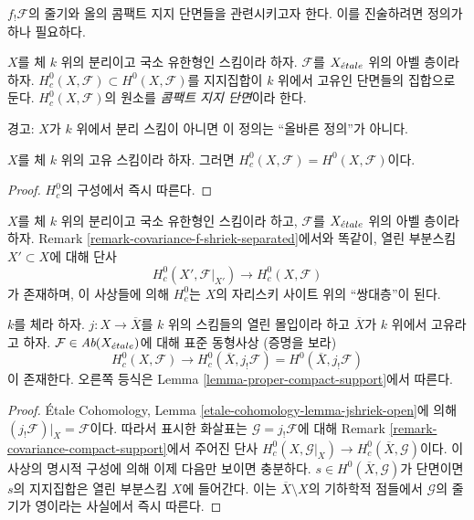 \noindent
$f_!\mathcal{F}$의 줄기와 올의 콤팩트 지지 단면들을 관련시키고자 한다.
이를 진술하려면 정의가 하나 필요하다.

\begin{definition}
\label{definition-compact-support}
$X$를 체 $k$ 위의 분리이고 국소 유한형인 스킴이라 하자.
$\mathcal{F}$를 $X_{\acute{e}tale}$ 위의 아벨 층이라 하자.
$H^0_c(X,\mathcal{F}) \subset H^0(X,\mathcal{F})$를 지지집합이
$k$ 위에서 고유인 단면들의 집합으로 둔다.
$H^0_c(X,\mathcal{F})$의 원소를 {\it 콤팩트 지지 단면}이라 한다.
\end{definition}

\noindent
경고: $X$가 $k$ 위에서 분리 스킴이 아니면 이 정의는 “올바른 정의”가
아니다.

\begin{lemma}
\label{lemma-proper-compact-support}
$X$를 체 $k$ 위의 고유 스킴이라 하자. 그러면
$H^0_c(X, \mathcal{F}) = H^0(X, \mathcal{F})$이다.
\end{lemma}

\begin{proof}
$H^0_c$의 구성에서 즉시 따른다.
\end{proof}

\begin{remark}
\label{remark-covariance-compact-support}
$X$를 체 $k$ 위의 분리이고 국소 유한형인 스킴이라 하고,
$\mathcal{F}$를 $X_{\acute{e}tale}$ 위의 아벨 층이라 하자.
Remark \ref{remark-covariance-f-shriek-separated}에서와 똑같이,
열린 부분스킴 $X' \subset X$에 대해 단사
$$
H^0_c(X', \mathcal{F}|_{X'}) \longrightarrow H^0_c(X, \mathcal{F})
$$
가 존재하며, 이 사상들에 의해 $H^0_c$는 $X$의 자리스키 사이트 위의
“쌍대층”이 된다.
\end{remark}

\begin{lemma}
\label{lemma-compactify-compact-support}
$k$를 체라 하자. $j : X \to \overline{X}$를 $k$ 위의 스킴들의
열린 몰입이라 하고 $\overline{X}$가 $k$ 위에서 고유라고 하자.
$\mathcal{F} \in \textit{Ab}(X_{\acute{e}tale})$에 대해 표준 동형사상
(증명을 보라)
$$
H^0_c(X, \mathcal{F}) \longrightarrow
H^0_c(\overline{X}, j_!\mathcal{F}) =
H^0(\overline{X}, j_!\mathcal{F})
$$
이 존재한다. 오른쪽 등식은 Lemma
\ref{lemma-proper-compact-support}에서 따른다.
\end{lemma}

\begin{proof}
\'Etale Cohomology, Lemma
\ref{etale-cohomology-lemma-jshriek-open}에 의해
$(j_!\mathcal{F})|_X = \mathcal{F}$이다. 따라서 표시한 화살표는
$\mathcal{G} = j_!\mathcal{F}$에 대해 Remark
\ref{remark-covariance-compact-support}에서 주어진 단사
$H^0_c(X,\mathcal{G}|_X) \to
H^0_c(\overline{X},\mathcal{G})$이다.
이 사상의 명시적 구성에 의해 이제 다음만 보이면 충분하다.
$s \in H^0(\overline{X},\mathcal{G})$가 단면이면 $s$의 지지집합은
열린 부분스킴 $X$에 들어간다. 이는
$\overline{X}\setminus X$의 기하학적 점들에서 $\mathcal{G}$의 줄기가
영이라는 사실에서 즉시 따른다.
\end{proof}

